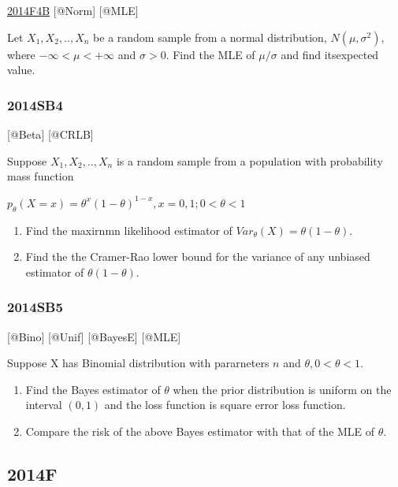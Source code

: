\documentclass[6pt,twocolumn,Portrait]{article}
\begin{document}
\protect\hyperlink{f4b-1}{2014F4B} {[}@Norm{]} {[}@MLE{]}

Let \(X_1,X_2,..,X_{n}\) be a random sample from a normal distribution,
\(N(\mu,\sigma^2)\), where \(-\infty<\mu<+\infty\) and \(\sigma>0\).
Find the MLE of \(\mu/\sigma\) and find itsexpected value.

\hypertarget{sb4-1}{%
\subsubsection{2014SB4}\label{sb4-1}}

{[}@Beta{]} {[}@CRLB{]}

Suppose \(X_1,X_2,..,X_{n}\) is a random sample from a population with
probability mass function

\(p_\theta(X=x)=\theta^{x}(1-\theta)^{1-x},x=0,1; 0<\theta<1\)

\begin{enumerate}
\def\labelenumi{(\alph{enumi})}
\item
  Find the maxirnmn likelihood estimator of
  \(Var_\theta(X) =\theta(1-\theta)\).
\item
  Find the the Cramer-Rao lower bound for the variance of any unbiased
  estimator of \(\theta(1-\theta)\).
\end{enumerate}

\hypertarget{sb5}{%
\subsubsection{2014SB5}\label{sb5}}

{[}@Bino{]} {[}@Unif{]} {[}@BayesE{]} {[}@MLE{]}

Suppose X has Binomial distribution with pararneters \(n\) and
\(\theta, 0<\theta<1\).

\begin{enumerate}
\def\labelenumi{(\alph{enumi})}
\item
  Find the Bayes estimator of \(\theta\) when the prior distribution is
  uniform on the interval \((0,1)\) and the loss function is square
  error loss function.
\item
  Compare the risk of the above Bayes estimator with that of the MLE of
  \(\theta\).
\end{enumerate}

\hypertarget{f-9}{%
\subsection{2014F}\label{f-9}}
\end{document}
